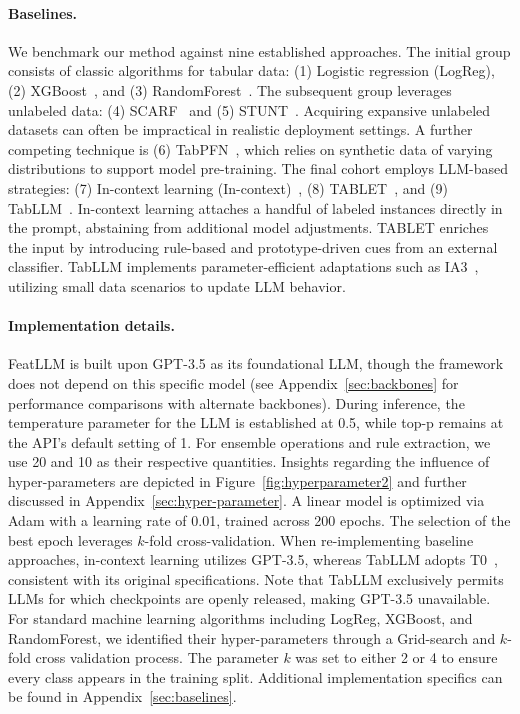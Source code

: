 \vspace*{-0.12in}
\paragraph{Baselines.}
We benchmark our method against nine established approaches. The initial group consists of classic algorithms for tabular data: (1) Logistic regression (LogReg), (2) XGBoost~\cite{chen2016xgboost}, and (3) RandomForest~\cite{ho1995random}. The subsequent group leverages unlabeled data: (4) SCARF~\cite{bahri2022scarf} and (5) STUNT~\cite{nam2023stunt}. Acquiring expansive unlabeled datasets can often be impractical in realistic deployment settings. A further competing technique is (6) TabPFN~\cite{hollmann2022tabpfn}, which relies on synthetic data of varying distributions to support model pre-training. The final cohort employs LLM-based strategies: (7) In-context learning (In-context)~\cite{wei2022emergent}, (8) TABLET~\cite{slack2023tablet}, and (9) TabLLM~\cite{hegselmann2023tabllm}. In-context learning attaches a handful of labeled instances directly in the prompt, abstaining from additional model adjustments. TABLET enriches the input by introducing rule-based and prototype-driven cues from an external classifier. TabLLM implements parameter-efficient adaptations such as IA3~\cite{liu2022few}, utilizing small data scenarios to update LLM behavior.

\vspace*{-0.12in}
\paragraph{Implementation details.}
\textsf{FeatLLM} is built upon GPT-3.5 as its foundational LLM, though the framework does not depend on this specific model (see Appendix~\ref{sec:backbones} for performance comparisons with alternate backbones). During inference, the temperature parameter for the LLM is established at 0.5, while top-p remains at the API's default setting of 1. For ensemble operations and rule extraction, we use 20 and 10 as their respective quantities. Insights regarding the influence of hyper-parameters are depicted in Figure~\ref{fig:hyperparameter2} and further discussed in Appendix~\ref{sec:hyper-parameter}.
A linear model is optimized via Adam with a learning rate of 0.01, trained across 200 epochs. The selection of the best epoch leverages $k$-fold cross-validation. When re-implementing baseline approaches, in-context learning utilizes GPT-3.5, whereas TabLLM adopts T0~\cite{sanh2022multitask}, consistent with its original specifications. Note that TabLLM exclusively permits LLMs for which checkpoints are openly released, making GPT-3.5 unavailable. For standard machine learning algorithms including LogReg, XGBoost, and RandomForest, we identified their hyper-parameters through a Grid-search and $k$-fold cross validation process. The parameter $k$ was set to either 2 or 4 to ensure every class appears in the training split. Additional implementation specifics can be found in Appendix~\ref{sec:baselines}.

